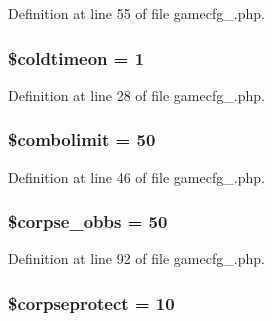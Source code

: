 Definition at line 55 of file gamecfg\+\_.\+php.

\hypertarget{gamecfg__1_8php_a673402e82c415b149cf5020f9890dd21}{
\subsubsection[{\$coldtimeon}]{\setlength{\rightskip}{0pt plus 5cm}\$coldtimeon = 1}}\label{gamecfg__1_8php_a673402e82c415b149cf5020f9890dd21}


Definition at line 28 of file gamecfg\+\_.\+php.

\hypertarget{gamecfg__1_8php_a07f60acd0b596786fcc385e2cfa1ca3d}{
\subsubsection[{\$combolimit}]{\setlength{\rightskip}{0pt plus 5cm}\$combolimit = 50}}\label{gamecfg__1_8php_a07f60acd0b596786fcc385e2cfa1ca3d}


Definition at line 46 of file gamecfg\+\_.\+php.

\hypertarget{gamecfg__1_8php_a2a3e2f1ad9ceb6f3dd91eeed944164c1}{
\subsubsection[{\$corpse\+\_\+obbs}]{\setlength{\rightskip}{0pt plus 5cm}\$corpse\+\_\+obbs = 50}}\label{gamecfg__1_8php_a2a3e2f1ad9ceb6f3dd91eeed944164c1}


Definition at line 92 of file gamecfg\+\_.\+php.

\hypertarget{gamecfg__1_8php_a1564489dfe7ea743f668ddcf07a0ca6b}{
\subsubsection[{\$corpseprotect}]{\setlength{\rightskip}{0pt plus 5cm}\$corpseprotect = 10}}\label{gamecfg__1_8php_a1564489dfe7ea743f668ddcf07a0ca6b}



